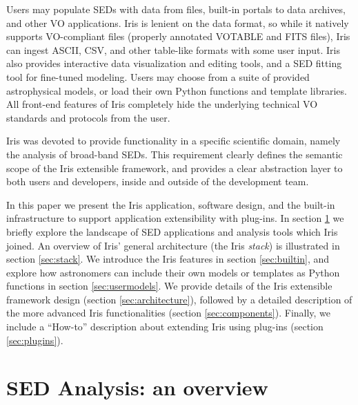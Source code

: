 \documentclass[preprint,12pt,3p]{elsarticle}
\begin{document}
Users may populate SEDs with data from files, built-in portals to data archives, and other VO applications. Iris is lenient on the data format, so while it natively supports VO-compliant files (properly annotated VOTABLE and FITS files), Iris can ingest ASCII, CSV, and other table-like formats with some user input. Iris also provides interactive data visualization and editing tools, and a SED fitting tool for fine-tuned modeling. Users may choose from a suite of provided astrophysical models, or load their own Python functions and template libraries. All front-end features of Iris completely hide the underlying technical VO standards and protocols from the user.

Iris was devoted to provide functionality in a specific scientific domain, namely the analysis of broad-band SEDs. This requirement clearly defines the semantic scope of the  Iris extensible framework, and provides a clear abstraction layer to both users and developers, inside and outside of the development team.

In this paper we present the Iris application, software design, and the built-in infrastructure to support application extensibility with plug-ins. In section \ref{sec:overview} we briefly explore the landscape of SED applications and analysis tools which Iris joined. An overview of Iris' general architecture (the Iris \emph{stack}) is illustrated in section \ref{sec:stack}. We introduce the Iris features in section \ref{sec:builtin}, and explore how astronomers can include their own models or templates as Python functions in section \ref{sec:usermodels}. We provide details of the Iris extensible framework design (section \ref{sec:architecture}), followed by a detailed description of the more advanced Iris functionalities (section \ref{sec:components}). Finally, we include a ``How-to'' description about extending Iris using plug-ins (section \ref{sec:plugins}).

\section{SED Analysis: an overview}
\label{sec:overview}
\end{document}
